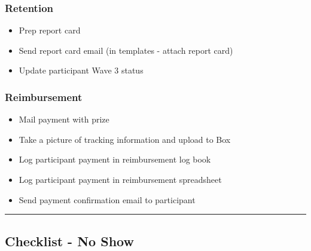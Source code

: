 \documentclass[]{book}
\providecommand{\tightlist}{%
  \setlength{\itemsep}{0pt}\setlength{\parskip}{0pt}}
\begin{document}
\hypertarget{retention-3}{%
\subsubsection{Retention}\label{retention-3}}

\begin{itemize}
\tightlist
\item
  Prep report card
\item
  Send report card email (in templates - attach report card)
\item
  Update participant Wave 3 status
\end{itemize}

\hypertarget{reimbursement-3}{%
\subsubsection{Reimbursement}\label{reimbursement-3}}

\begin{itemize}
\tightlist
\item
  Mail payment with prize
\item
  Take a picture of tracking information and upload to Box
\item
  Log participant payment in reimbursement log book
\item
  Log participant payment in reimbursement spreadsheet
\item
  Send payment confirmation email to participant
\end{itemize}

\begin{center}\rule{0.5\linewidth}{0.5pt}\end{center}

\hypertarget{checklist---no-show-2}{%
\subsection{Checklist - No Show}\label{checklist---no-show-2}}
\end{document}
